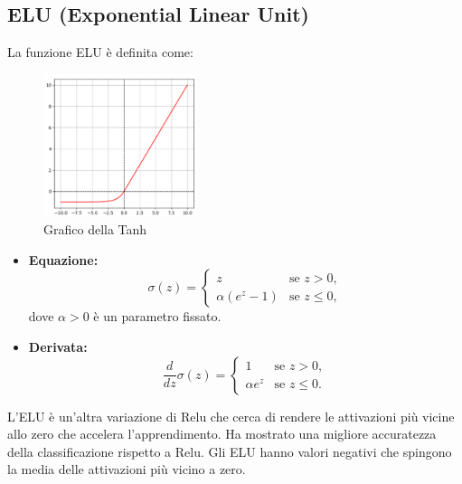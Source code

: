 \subsection{ELU (Exponential Linear Unit)}
La funzione ELU è definita come:
\begin{multicols}{2}
    {
        \begin{figure}[H]
            \centering
            \includegraphics[width=0.40\textwidth]{Immagini/Grafici/graficoElu.png}
            \caption{Grafico della Tanh}
        \end{figure}
    }
    {
        \begin{itemize}
            \item \textbf{Equazione:}
            \begin{equation}
                \sigma(z) = \begin{cases}
                    z & \text{se } z > 0, \\
                    \alpha(e^z - 1) & \text{se } z \leq 0,
                \end{cases}
            \end{equation}
            dove \(\alpha > 0\) è un parametro fissato.
            \item \textbf{Derivata:}
            \begin{equation}
                \frac{d}{dz}\sigma(z) = \begin{cases}
                    1 & \text{se } z > 0, \\
                    \alpha e^z & \text{se } z \leq 0.
                \end{cases}
            \end{equation}
        \end{itemize}
    }
\end{multicols}

L'ELU è un’altra variazione di Relu che cerca di rendere le attivazioni più 
vicine allo zero che accelera l’apprendimento. Ha mostrato una migliore accuratezza 
della classificazione rispetto a Relu. Gli ELU hanno valori negativi che spingono la 
media delle attivazioni più vicino a zero.


